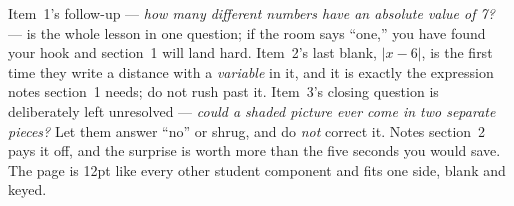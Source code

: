\documentclass[10pt]{article}
\begin{document}
\begin{teachernote}[Warm-Up]
Item~1's follow-up --- \emph{how many different numbers have an absolute value of 7?} --- is the
whole lesson in one question; if the room says ``one,'' you have found your hook and section~1 will
land hard. Item~2's last blank, $|x-6|$, is the first time they write a distance with a
\emph{variable} in it, and it is exactly the expression notes section~1 needs; do not rush past it.
Item~3's closing question is deliberately left unresolved --- \emph{could a shaded picture ever come
in two separate pieces?} Let them answer ``no'' or shrug, and do \emph{not} correct it. Notes
section~2 pays it off, and the surprise is worth more than the five seconds you would save. The
page is 12pt like every other student component and fits one side, blank and keyed.
\end{teachernote}
\end{document}

